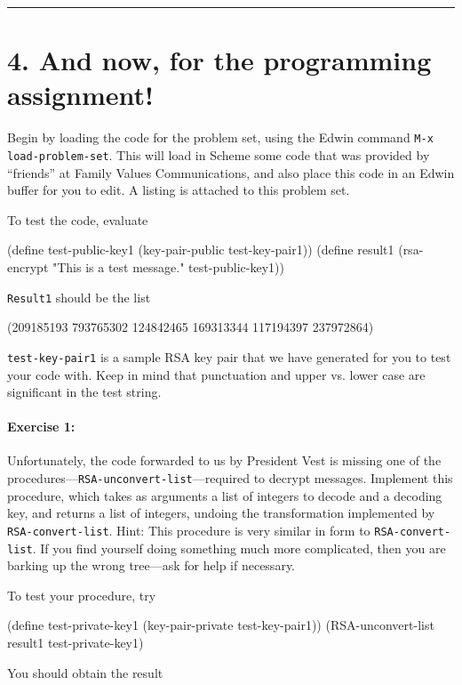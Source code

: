 \rule{6.5 in}{0.5 pt}

\vfill
\newpage

\section{4. And now, for the programming assignment!}

Begin by loading the code for the problem set, using the Edwin command
{\tt M-x load-problem-set}.  This will load in Scheme some code that
was provided by ``friends'' at Family Values Communications, and also
place this code in an Edwin buffer for you to edit.  A listing is
attached to this problem set.

To test the code, evaluate

\beginlisp
(define test-public-key1 (key-pair-public test-key-pair1))
(define result1 (rsa-encrypt "This is a test message." test-public-key1))
\endlisp

\noindent
{\tt Result1} should be the list

\beginlisp
(209185193 793765302 124842465 169313344 117194397 237972864)
\endlisp

\noindent
{\tt test-key-pair1} is a sample RSA key pair that we have
generated for you to test your code with.  Keep in mind that punctuation
and upper vs. lower case are significant in the test string.

\paragraph{Exercise 1:}
Unfortunately, the code forwarded to us by President Vest is missing
one of the procedures---{\tt RSA-unconvert-list}---required to decrypt
messages.  Implement this procedure, which takes as arguments a list
of integers to decode and a decoding key, and returns a list of
integers, undoing the transformation implemented by {\tt
RSA-convert-list}.  Hint: This procedure is very similar in form to
{\tt RSA-convert-list}.  If you find yourself doing something much
more complicated, then you are barking up the wrong tree---ask
for help if necessary.

To test your procedure, try

\beginlisp
(define test-private-key1 (key-pair-private test-key-pair1))
\null
(RSA-unconvert-list result1 test-private-key1)
\endlisp

\noindent
You should obtain the result

